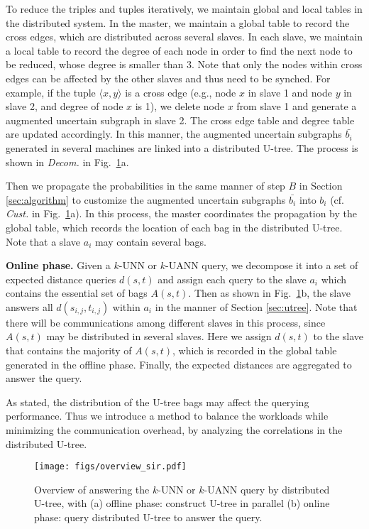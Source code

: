 To reduce the triples and tuples iteratively, we maintain global and local tables in the distributed system. In the master, we maintain a global table to record the cross edges, which are distributed across several slaves. In each slave, we maintain a local table to record the degree of each node in order to find the next node to be reduced, whose degree is smaller than 3. Note that only the nodes within cross edges can be affected by the other slaves and thus need to be synched.
For example, if the tuple $\langle x,y\rangle$ is a cross edge (e.g., node $x$ in slave 1 and node $y$ in slave 2, and degree of node $x$ is 1), we delete node $x$ from slave 1 and generate a augmented uncertain subgraph in slave 2. The cross edge table and degree table are updated accordingly. In this manner, the augmented uncertain subgraphs $\bar{b_i}$ generated in several machines are linked into a distributed U-tree. The process is shown in \textit{Decom.} in Fig.~\ref{fig:overview-sir}a.

Then we propagate the probabilities in the same manner of step $B$ in Section \ref{sec:algorithm} to customize the augmented uncertain subgraphs $\bar{b_i}$ into $b_i$ (cf. \textit{Cust.} in Fig.~\ref{fig:overview-sir}a). In this process, the master coordinates the propagation by the global table, which records the location of each bag in the distributed U-tree. Note that a slave $a_i$ may contain several bags.

\textbf{Online phase. } 
Given a $k$-UNN or $k$-UANN query, we decompose it into a set of expected distance queries $d(s,t)$ and assign each query to the slave $a_i$ which contains the essential set of bags $A(s,t)$. Then as shown in Fig.~\ref{fig:overview-sir}b, the slave answers all $d(s_{i,j},t_{i,j})$ within $a_i$ in the manner of Section \ref{sec:utree}. Note that there will be communications among different slaves in this process, since $A(s,t)$ may be distributed in several slaves. Here we assign $d(s,t)$ to the slave that contains the majority of $A(s,t)$, which is recorded in the global table generated in the offline phase. Finally, the expected distances are aggregated to answer the query.

As stated, the distribution of the U-tree bags may affect the querying performance. Thus we introduce a method to balance the workloads while minimizing the communication overhead, by analyzing the correlations in the distributed U-tree. 
\begin{figure}[!t]
	\centering
	\texttt{[image: figs/overview\_sir.pdf]}
	\caption{\npart Overview of answering the $k$-UNN or $k$-UANN query by distributed U-tree, with (a) offline phase: construct U-tree in parallel (b) online phase: query distributed U-tree to answer the query.}
	\label{fig:overview-sir}
\end{figure}

